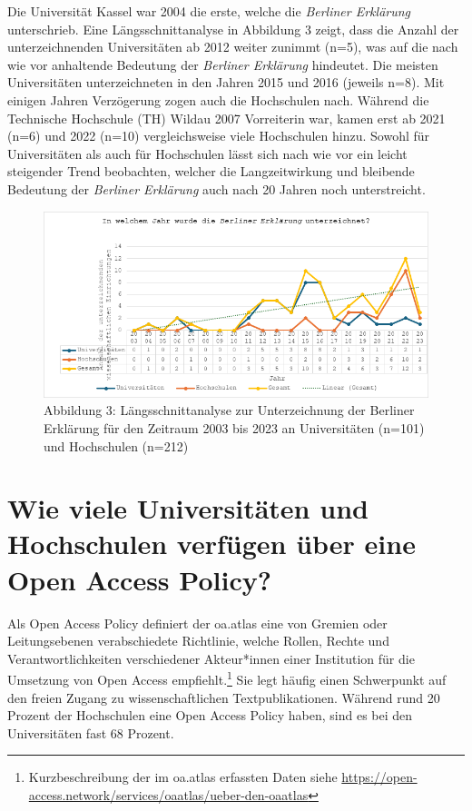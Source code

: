 \documentclass[a4paper,
fontsize=11pt,
oneside,
numbers=noperiodatend,
parskip=half-,
bibliography=totoc,
final
]{scrartcl}
\begin{document}
Die Universität Kassel war 2004 die erste, welche die \emph{Berliner
Erklärung} unterschrieb. Eine Längsschnittanalyse in Abbildung 3 zeigt,
dass die Anzahl der unterzeichnenden Universitäten ab 2012 weiter
zunimmt (n=5), was auf die nach wie vor anhaltende Bedeutung der
\emph{Berliner Erklärung} hindeutet. Die meisten Universitäten
unterzeichneten in den Jahren 2015 und 2016 (jeweils n=8). Mit einigen
Jahren Verzögerung zogen auch die Hochschulen nach. Während die
Technische Hochschule (TH) Wildau 2007 Vorreiterin war, kamen erst ab
2021 (n=6) und 2022 (n=10) vergleichsweise viele Hochschulen hinzu.
Sowohl für Universitäten als auch für Hochschulen lässt sich nach wie
vor ein leicht steigender Trend beobachten, welcher die Langzeitwirkung
und bleibende Bedeutung der \emph{Berliner Erklärung} auch nach 20
Jahren noch unterstreicht.

\begin{figure}[H]
\centering
\includegraphics[width=1\textwidth]{img/image003.png}
\caption{Abbildung 3: Längsschnittanalyse zur Unterzeichnung der Berliner Erklärung für den Zeitraum 2003 bis 2023 an Universitäten (n=101) und Hochschulen (n=212)}
\end{figure}

\section{Wie viele Universitäten und Hochschulen verfügen über
eine Open Access
Policy?}\label{wie-viele-universituxe4ten-und-hochschulen-verfuxfcgen-uxfcber-eine-open-access-policy}

Als Open Access Policy definiert der oa.atlas eine von Gremien oder
Leitungsebenen verabschiedete Richtlinie, welche Rollen, Rechte und
Verantwortlichkeiten verschiedener Akteur*innen einer Institution für
die Umsetzung von Open Access empfiehlt.\footnote{Kurzbeschreibung der
  im oa.atlas erfassten Daten siehe
  \url{https://open-access.network/services/oaatlas/ueber-den-oaatlas}}
Sie legt häufig einen Schwerpunkt auf den freien Zugang zu
wissenschaftlichen Textpublikationen. Während rund 20 Prozent der
Hochschulen eine Open Access Policy haben, sind es bei den Universitäten
fast 68 Prozent.
\end{document}
